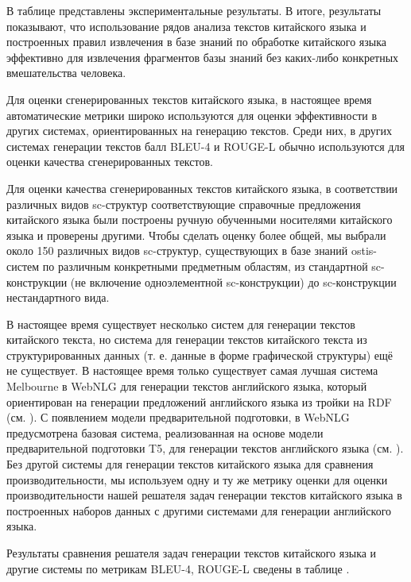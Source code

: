 В таблице \textit{} представлены экспериментальные результаты. В итоге, результаты показывают, что использование рядов анализа текстов китайского языка и построенных правил извлечения в базе знаний по обработке китайского языка эффективно для извлечения фрагментов базы знаний без каких-либо конкретных вмешательства человека. 

Для оценки сгенерированных текстов китайского языка, в настоящее время автоматические метрики широко используются для оценки эффективности в других системах, ориентированных на генерацию текстов. Среди них, в других системах генерации текстов балл BLEU-4 и ROUGE-L обычно используются для оценки качества сгенерированных текстов.

Для оценки качества сгенерированных текстов китайского языка, в соответствии различных видов sc-структур соответствующие справочные предложения китайского языка были построены ручную обученными носителями китайского языка и проверены другими. Чтобы сделать оценку более общей, мы выбрали около 150 различных видов sc-структур, существующих в базе знаний ostis-систем по различным конкретными предметным областям, из стандартной sc-конструкции (не включение одноэлементной sc-конструкции) до sc-конструкции нестандартного вида.

В настоящее время существует несколько систем для генерации текстов китайского текста, но система для генерации текстов китайского текста из структурированных данных (т. е. данные в форме графической структуры) ещё не существует. В настоящее время только существует самая лучшая система Melbourne в WebNLG для генерации текстов английского языка, который ориентирован на генерации предложений английского языка из тройки на RDF (см. ). С появлением модели предварительной подготовки, в WebNLG предусмотрена базовая система, реализованная на основе модели предварительной подготовки T5, для генерации текстов английского языка (см. ). Без другой системы для генерации текстов китайского языка для сравнения производительности, мы используем одну и ту же метрику оценки для оценки производительности нашей решателя задач генерации текстов китайского языка в построенных наборов данных с другими системами для генерации английского языка.

Результаты сравнения решателя задач генерации текстов китайского языка и другие системы по метрикам BLEU-4, ROUGE-L сведены в таблице \textit{}.

